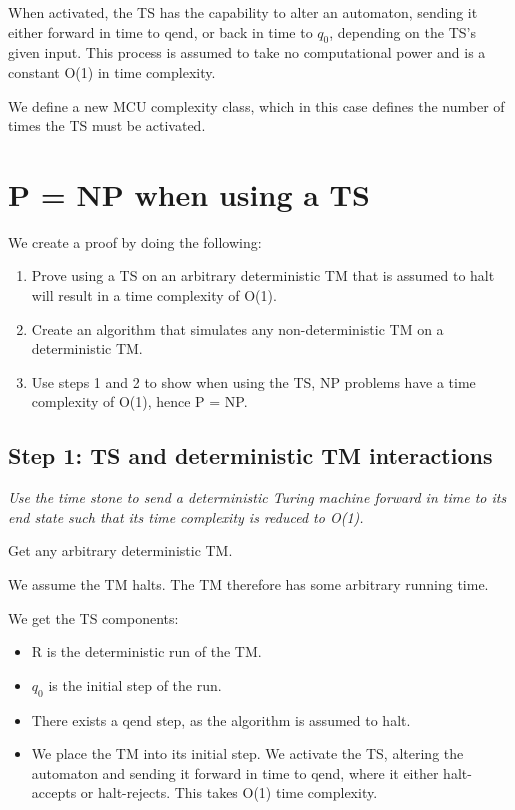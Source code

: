 \documentclass{report}
\begin{document}
When activated, the TS has the capability to alter an automaton, sending it either forward in time to qend, or back in time to $q_0$, depending on the TS's given input. This process is assumed to take no computational power and is a constant O(1) in time complexity.

We define a new MCU complexity class, which in this case defines the number of times the TS must be activated.

\section{P = NP when using a TS}

We create a proof by doing the following:

\begin{enumerate}
  \item Prove using a TS on an arbitrary deterministic TM that is assumed to halt will result in a time complexity of O(1).
  \item Create an algorithm that simulates any non-deterministic TM on a deterministic TM.
  \item Use steps 1 and 2 to show when using the TS, NP problems have a time complexity of O(1), hence P = NP.
\end{enumerate}

\subsection{Step 1: TS and deterministic TM interactions}

\textit{Use the time stone to send a deterministic Turing machine forward in time to its end state such that its time complexity is reduced to O(1).}

Get any arbitrary deterministic TM.

We assume the TM halts. The TM therefore has some arbitrary running time.

We get the TS components:

\begin{itemize}
  \item R is the deterministic run of the TM.
  \item $q_0$ is the initial step of the run.
  \item There exists a qend step, as the algorithm is assumed to halt.
  \item We place the TM into its initial step. We activate the TS, altering the automaton and sending it forward in time to qend, where it either halt-accepts or halt-rejects. This takes O(1) time complexity.
\end{itemize}
\end{document}
